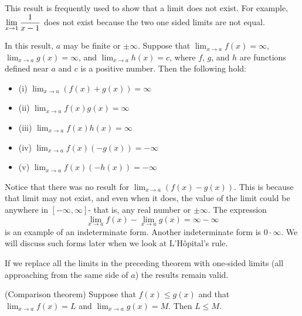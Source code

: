 \begin{example}
\begin{example}
This result is frequently used to show that a limit does not exist. For example, $
 \displaystyle{\lim _{x\to 1} {1\over x-1}  }$ does not exist because the two one sided limits are not equal.

 \begin{theorem} In this result, $a$ may be finite or $\pm \infty $. Suppose that
  $\displaystyle{\lim _{x\to a} f(x)
 } =\infty $,  $\displaystyle{\lim _{x\to a} g(x)
 } =\infty $, and $ \displaystyle{\lim _{x\to a} h(x)
 } =c $, where $f$, $g$, and $h$ are functions defined near $a$ and $c$ is a positive number.
 Then the following hold:

\begin{itemize} %

\item{ (i)} $\displaystyle{\lim _{x\to a} (f(x) +g(x))
 } =\infty $

\item{ (ii)} $\displaystyle{\lim _{x\to a} f(x)g(x)
 } =\infty $

\item{ (iii)} $\displaystyle{\lim _{x\to a} f(x)h(x)
 } =\infty $

\item{(iv)} $\displaystyle{\lim _{x\to a} f(x)(-g(x))
 } =-\infty $


\item{ (v)} $\displaystyle{\lim _{x\to a} f(x)(-h(x))
 } =-\infty $

\end{itemize}
 \label{thm:yet more properties of limits}
\end{theorem}

Notice that there was no result for $\displaystyle{\lim _{x\to a}
 (f(x) -g(x)) } $. This is because that limit may not exist, and even
 when it does, the value of the limit could be anywhere in $[-\infty ,
 \infty ] $- that is, any real number or $\pm \infty $. The expression
 $$ \displaystyle{\lim _{x\to a} f(x) } -\displaystyle{\lim _{x\to a}
 g(x) } =\infty -\infty $$ is an example of an 
{\dfont indeterminate form}. 
Another indeterminate form is $0\cdot \infty $. We will discuss
 such forms later when we look at
 L'H\^opital's rule.

If we replace all the limits in the preceding theorem with one-sided
limits (all approaching from the same side of $a$) the results remain
valid.

\begin{theorem} (Comparison theorem)
Suppose that $f(x) \leq g(x) $ and that $\displaystyle{\lim _{x\to a} }f(x)=L $ and
 $\displaystyle{\lim _{x\to a} }g(x) =M $. Then  $L \leq M $.
\label{thm: comparison theorem}
 \end{theorem}


\end{example}
\end{example}
